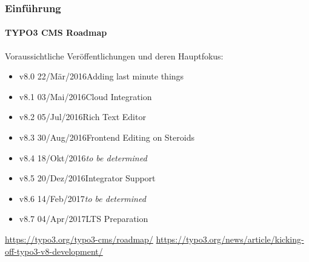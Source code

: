 \begin{frame}[fragile]
	\frametitle{Einführung}
	\framesubtitle{TYPO3 CMS Roadmap}

	Voraussichtliche Veröffentlichungen und deren Hauptfokus:

	\begin{itemize}

		\item v8.0 \tabto{1.1cm}22/Mär/2016\tabto{3.4cm}Adding last minute things
		\item
			\begingroup
				\color{typo3orange}
					v8.1 \tabto{1.1cm}03/Mai/2016\tabto{3.4cm}Cloud Integration
			\endgroup
		\item v8.2 \tabto{1.1cm}05/Jul/2016\tabto{3.4cm}Rich Text Editor
		\item v8.3 \tabto{1.1cm}30/Aug/2016\tabto{3.4cm}Frontend Editing on Steroids
		\item v8.4 \tabto{1.1cm}18/Okt/2016\tabto{3.4cm}\textit{to be determined}
		\item v8.5 \tabto{1.1cm}20/Dez/2016\tabto{3.4cm}Integrator Support
		\item v8.6 \tabto{1.1cm}14/Feb/2017\tabto{3.4cm}\textit{to be determined}
		\item v8.7 \tabto{1.1cm}04/Apr/2017\tabto{3.4cm}LTS Preparation

	\end{itemize}

	\smaller
		\url{https://typo3.org/typo3-cms/roadmap/}\newline
		\url{https://typo3.org/news/article/kicking-off-typo3-v8-development/}
	\normalsize

\end{frame}

